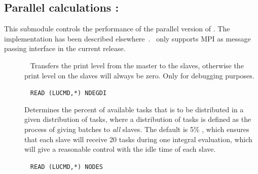 \subsection{Parallel calculations : }

This submodule controls the performance of the parallel
version
of \dalton . The implementation has been described
elsewhere~\cite{pndjhapdkrthhkcpl253}. \dalton\ only supports MPI as
message passing interface in the current release.

\begin{description}

\item[]\verb| |
Transfers the print level from the master
to the slaves, otherwise the print level on the slaves will always be
zero. Only for debugging purposes.

\item[]\verb| |\newline
\verb|READ (LUCMD,*) NDEGDI|

Determines the percent of available tasks that
is to be distributed in
a given distribution of tasks, where a distribution of tasks is defined
as the process of giving batches to {\em all} slaves. The default is
5\% , which ensures that each slave will receive 20 tasks during one
integral evaluation, which will give a reasonable control with the
idle time of each slave.

%
%
%

\item[]\verb| |\newline
\verb|READ (LUCMD,*) NODES|


\end{description}
